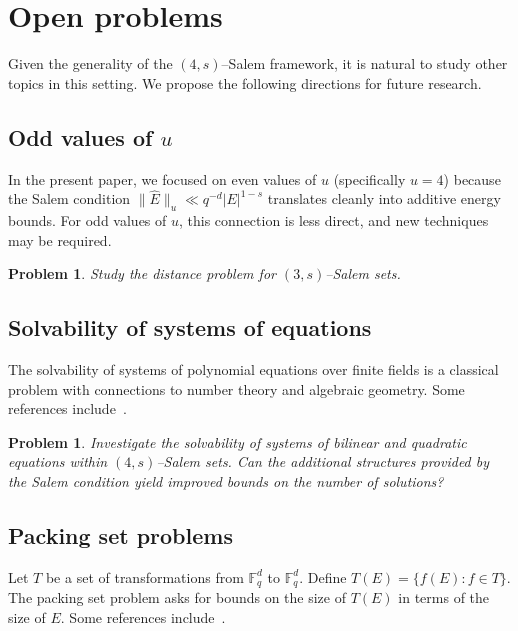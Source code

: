 \documentclass[11pt]{article}
\newtheorem{problem}[theorem]{Problem}
\begin{document}
\section{Open problems}\label{section-7}
Given the generality of the \((4,s)\)–Salem framework, it is natural to study other topics in this setting. We propose the following directions for future research.

\subsection{Odd values of $u$}

In the present paper, we focused on even values of $u$ (specifically $u = 4$) because the Salem condition $\|\widehat{E}\|_u \ll q^{-d}|E|^{1-s}$ translates cleanly into additive energy bounds. For odd values of $u$, this connection is less direct, and new techniques may be required.

\begin{problem}
Study the distance problem for $(3, s)$--Salem sets.
\end{problem}


\subsection{Solvability of systems of equations}

The solvability of systems of polynomial equations over finite fields is a classical problem with connections to number theory and algebraic geometry. Some references include~\cite{revista, sol4, hh2, sol5, sol3, sh2, sol1, sol2}.

\begin{problem}
Investigate the solvability of systems of bilinear and quadratic equations within $(4, s)$--Salem sets. Can the additional structures provided by the Salem condition yield improved bounds on the number of solutions?
\end{problem}





\subsection{Packing set problems}
Let $T$ be a set of transformations from $\mathbb{F}_q^d$ to $\mathbb{F}_q^d$. Define $T(E)=\{f(E)\colon f\in T\}$. 
The packing set problem asks for bounds on the size of $T(E)$ in terms of the size of $E$. Some references include~\cite{pack2, pack1}.
\end{document}
